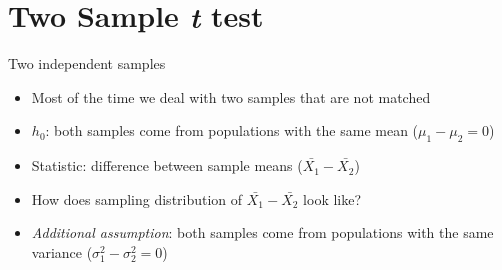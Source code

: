 \documentclass[
  ignorenonframetext,
]{beamer}
\providecommand{\tightlist}{%
  \setlength{\itemsep}{0pt}\setlength{\parskip}{0pt}}
\begin{document}
\section{\texorpdfstring{Two Sample \emph{t}
test}{Two Sample t test}}\label{two-sample-t-test}

\begin{frame}{Two independent samples}
\label{two-independent-samples}
\begin{itemize}
\tightlist
\item
  Most of the time we deal with two samples that are not matched
\item
  \(h_0\): both samples come from populations with the same mean
  (\(\mu_1 - \mu_2 = 0\))
\item
  Statistic: difference between sample means (\(\bar{X_1} - \bar{X_2}\))
\item
  How does sampling distribution of \(\bar{X_1} - \bar{X_2}\) look like?
\item
  \emph{Additional assumption}: both samples come from populations with
  the same variance (\(\sigma^2_1 - \sigma^2_2 = 0\))
\end{itemize}
\end{frame}
\end{document}
